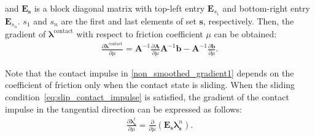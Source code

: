 and $\mathbf{E}_{\mathbf{s}}$ is a block diagonal matrix with top-left entry $\mathbf{E}_{s_1}$ and bottom-right entry $\mathbf{E}_{s_n}$. $s_1$ and $s_n$ are the first and last elements of set $\mathbf{s}$, respectively.
Then, the gradient of $\bm{\lambda}^{\mathrm{{contact}}}$ with respect to friction coefficient $\mu$ can be obtained:
\begin{align}
\label{non_smoothed_gradient1}
\frac{\partial \bm{\lambda}^{\mathrm{contact}}}{\partial \mu}= \mathbf{A}^{-1} \frac{\partial \mathbf{A}}{\partial \mu}\mathbf{A}^{-1}\mathbf{b}-\mathbf{A}^{-1}\frac{\partial \mathbf{b}}{\partial \mu}.
\end{align}

Note that the contact impulse in \eqref{non_smoothed_gradient1} depends on the coefficient of friction only when the contact state is sliding. When the sliding condition~\eqref{eq:slip_contact_impulse} is satisfied, the gradient of the contact impulse in the tangential direction can be expressed as follows: 
\begin{align}
\label{non_smoothed_gradient_sliding}
\frac{\partial \bm{\lambda}^{t}_\mathbf{s}}{\partial \mu} = \frac{\partial}{\partial \mu}(\mathbf{E}_{\mathbf{s}}\bm{\lambda}^n_{\mathbf{s}}).
\end{align}



